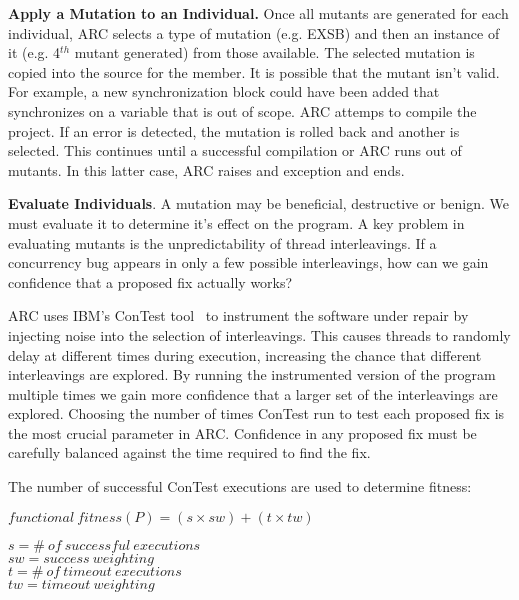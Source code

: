 \documentclass[runningheads,a4paper]{llncs}
\begin{document}

\textbf{{Apply a Mutation to an Individual}.} Once all mutants are generated for each individual, ARC selects a type of mutation (e.g. EXSB) and then an instance of it (e.g. 4$^{th}$ mutant generated) from those available. The selected mutation is copied into the source for the member. It is possible that the mutant isn't valid. For example, a new synchronization block could have been added that synchronizes on a variable that is out of scope. ARC attemps to compile the project.  If an error is detected, the mutation is rolled back and another is selected. This continues until a successful compilation or ARC runs out of mutants. In this latter case, ARC raises and exception and ends.


\textbf{Evaluate Individuals}. A mutation may be beneficial, destructive or benign. We must evaluate it to determine it's effect on the program. A key problem in evaluating mutants is the unpredictability of thread interleavings. If a concurrency bug appears in only a few possible interleavings, how can we gain confidence that a proposed fix actually works? 

ARC uses IBM's ConTest tool~\cite{EFN+02} to instrument the software under repair by injecting noise into the selection of interleavings. This causes threads to randomly delay at different times during execution, increasing the chance that different interleavings are explored. By running the instrumented version of the program multiple times we gain more confidence that a larger set of the interleavings are explored. Choosing the number of times ConTest run to test each proposed fix is the most crucial parameter in ARC.  Confidence in any proposed fix must be carefully balanced against the time required to find the fix.

The number of successful ConTest executions are used to determine fitness:
\newline
\begin{footnotesize}
\begin{center}
$functional\ fitness(P) = (s \times sw) + (t \times tw)$
\end{center}
\end{footnotesize}
\begin{scriptsize}
\begin{center}
$s = \#\ of\ successful\ executions$ \\
$sw = success\ weighting$ \\
$t = \#\ of\ timeout\ executions$ \\
$tw = timeout\ weighting$
\end{center}
\end{scriptsize}
\end{document}
